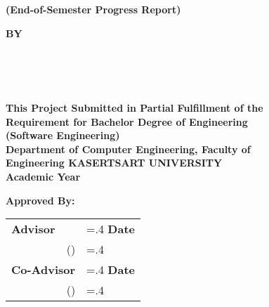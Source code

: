 \thispagestyle{empty}
\begin{center}
    {\huge\textbf{\usevar{\srsTitle}}} %
    {\huge\textbf{(End-of-Semester Progress Report)}}\vspace{1in}

    {\huge\textbf{BY}}\vspace{.5in}

    {\huge\textbf{%
        \usevar{\srsAuthorOne} \\
        \usevar{\srsAuthorTwo} \\
        \usevar{\srsAuthorThree} \\
    }}\vfill

    {\large\textbf{%
        This Project Submitted in Partial Fulfillment of the\\
        Requirement for Bachelor Degree of Engineering\\
        (Software Engineering)\\
        Department of Computer Engineering, Faculty of\\
        Engineering KASERTSART UNIVERSITY\\
        Academic Year \usevar{\srsAcademicYear}\\
    }}
\end{center}

\vspace{.5in}

{\large\textbf{Approved By:}}\vspace{.2in}

\begin{tabularx}{1\textwidth}{X >{\hsize=.4\hsize}X}
    \textbf{Advisor}\dotfill & \textbf{Date}\dotfill \\
    \multicolumn{1}{r}{(\usevar{\srsAdvisorName})} & \\[.1in]

    \textbf{Co-Advisor}\dotfill & \textbf{Date}\dotfill \\
    \multicolumn{1}{r}{(\usevar{\srsCoAdvisorName})} & \\[.1in]
    
\end{tabularx}

\restoregeometry
